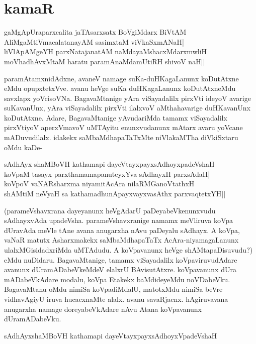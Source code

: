 \chapter{kamaR}\label{chap5}

\begin{shloka}
gaMgApUraparxcalita jaTAsarxsatx BoVgiMdarx BiVtAM\\
AliMgaMtiVmacalatanayAM sasimxtaM viVkaSxmANaH|\\
liVlApAMgeYH parxNatajanatAM naMdayaMshacxMdarxmwliH\\
moVhadhAvxMtaM haratu paramAnaMdamUtiRH shivoV naH||
\end{shloka}

paramAtamxnidAdxne, avaneV namage suKa-duHKagaLanunx koDutAtxne eMdu opupxtetxVve. avanu heVge suKa duHKagaLanunx koDutAtxneMdu savxlapx yoVcisoVNa. BagavaMtanige yAra viSayadalilx pirxVti ideyoV avarige suKavanUnx, yAra viSayadalilx pirxVti ilalxvoV aMthahavarige duHKavanUnx koDutAtxne. Adare, BagavaMtanige yAvudariMda tamamx viSayadalilx pirxVtiyoV aperxVmavoV uMTAyitu enunxvudanunx mAtarx avaru yoVcane mADuvudilalx. idakekx saMbaMdhapaTaTxMte niVlakaMTha diVkiSxtaru oMdu kaDe-

\begin{shloka}
sAdhAyx shaMBoVH kathamapi dayeVtayxpayxsAdhoyxpadeVshaH\\
koVpaM tasayx parxthamamapanuteyxYva sAdhayxH parxsAdaH|\\
koVpoV vaNARsharxma niyamitAcAra nilaRMGanoVtathxH\\
shAMtiM neVyaH sa kathamadhunApayxvayxvasAthx parxvaqtetxYH||
\end{shloka}

(parameVshavxrana dayeyanunx heVgAdarU paDeyabeVkenunxvudu sAdhayxvAda upadeVsha. parameVshavxranige namamx meVliruva koVpa dUravAda meVle tAne avana anugarxha nAvu paDeyalu sAdhayx. A koVpa, vaNaR matutx Asharxmakekx saMbaMdhapaTaTx AcAra-niyamagaLanunx ulalxMGisidadxriMda uMTAdudu. A koVpavanunx heVge shAMtapaDisuvudu?) eMdu nuDidaru. BagavaMtanige, tamamx viSayadalilx koVpaviruvudAdare avanunx dUramADabeVkeMdeV elalxrU BAvisutAtxre. koVpavanunx dUra mADabeVkAdare modalu, koVpa Etakekx baMdideyeMdu noVDabeVku. BagavaMtanu oMdu nimiSa koVpadiMdalU, matotxMdu nimiSa beVre vidhavAgiyU iruva hucacxnaMte alalx. avanu savaRjacnx. hAgiruvavana anugarxha namage doreyabeVkAdare nAvu Atana koVpavanunx dUramADabeVku.

\begin{shloka}
sAdhAyxshaMBoVH kathamapi dayeVtayxpayxsAdhoyxVpadeVshaH
\end{shloka}

